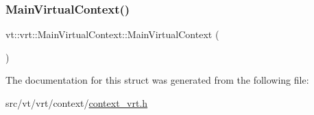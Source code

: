 \subsubsection{\texorpdfstring{Main\+Virtual\+Context()}{MainVirtualContext()}}
{\footnotesize\ttfamily vt\+::vrt\+::\+Main\+Virtual\+Context\+::\+Main\+Virtual\+Context (\begin{DoxyParamCaption}{ }\end{DoxyParamCaption})\hspace{0.3cm}{\ttfamily [inline]}}



The documentation for this struct was generated from the following file\+:\begin{DoxyCompactItemize}
\item 
src/vt/vrt/context/\hyperlink{context__vrt_8h}{context\+\_\+vrt.\+h}\end{DoxyCompactItemize}
